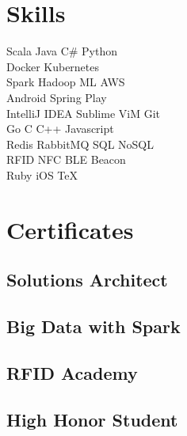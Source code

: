 \documentclass[]{furkanvarol-resume}
\begin{document}
\begin{minipage}[t]{0.33\textwidth}
\section{Skills}
Scala \textbullet{} Java \textbullet{} C\# \textbullet{} Python \\
Docker \textbullet{} Kubernetes \\
Spark \textbullet{} Hadoop \textbullet{}  ML \textbullet{} AWS \\
Android \textbullet{} Spring \textbullet{} Play \\
IntelliJ IDEA \textbullet{} Sublime \textbullet{} ViM \textbullet{} Git \\
Go \textbullet{} C \textbullet{} C++ \textbullet{} Javascript \\
Redis \textbullet{} RabbitMQ \textbullet{} SQL \textbullet{} NoSQL \\
RFID \textbullet{} NFC \textbullet{} BLE \textbullet{} Beacon \\
Ruby \textbullet{} iOS \textbullet{} TeX
\sectionsep


\section{Certificates}

\subsection{Solutions Architect}
\sectionsep

\subsection{Big Data with Spark}
\sectionsep

\subsection{RFID Academy}
\sectionsep

\subsection{High Honor Student}
\sectionsep


\end{minipage}
\end{document}

